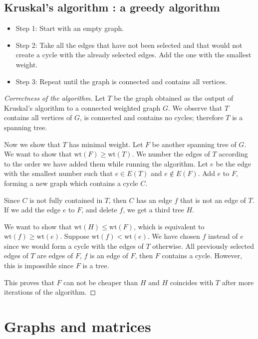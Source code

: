 \subsection*{Kruskal's algorithm : a greedy algorithm}

\begin{itemize}
\item Step 1: Start with an empty graph.
\item Step 2: Take all the edges that have not been selected and that would not create a cycle with the already selected edges. Add the one with the smallest weight.
\item Step 3: Repeat until the graph is connected and contains all vertices.
\end{itemize}
\begin{proof}[Correctness of the algorithm]
Let $T$ be the graph obtained as the output of Kruskal's algorithm to a connected weighted graph $G$. We observe that $T$ contains all vertices of $G$, is connected and contains no cycles; therefore $T$ is a spanning tree.

Now we show that $T$ has minimal weight. Let $F$ be another spanning tree of $G$. We want to show that $\mathrm{wt}(F)\ge \mathrm{wt}(T)$. We number the edges of $T$ according to the order we have added them while running the algorithm. Let $e$ be the edge with the smallest number such that $e\in E(T)$ and $e\not\in E(F)$. Add $e$ to $F$, forming a new graph which contains a cycle $C$.

Since $C$ is not fully contained in $T$, then $C$ has an edge $f$ that is not an edge of $T$. If we add the edge $e$ to $F$, and delete $f$, we get a third tree $H$. 

We want to show that $\mathrm{wt}(H)\le\mathrm{wt}(F)$, which is equivalent to $\mathrm{wt}(f)\ge\mathrm{wt}(e)$. Suppose $\mathrm{wt}(f)<\mathrm{wt}(e)$. We have chosen $f$ instead of $e$ since we would form a cycle with the edges of $T$ otherwise. All previously selected edges of $T$ are edges of $F$, $f$ is an edge of $F$, then $F$ contains a cycle. However, this is impossible since $F$ is a tree. 

This proves that $F$ can not be cheaper than $H$ and $H$ coincides with $T$ after more iterations of the algorithm.
\end{proof}

\section{Graphs and matrices}

